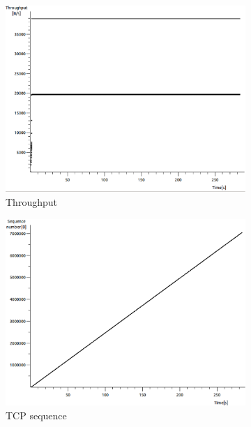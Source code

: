 \documentclass[conference,a4paper]{../../sty/IEEEtran}
\begin{document}
\begin{figure}
 \centering
 \begin{subfigure}[b]{0.2\textwidth}
  \includegraphics[width=\textwidth]{s4-1_thru}
  \caption{Throughput}
 \end{subfigure}
 \begin{subfigure}[b]{0.2\textwidth}
  \includegraphics[width=\textwidth]{s4-1_seq}
  \caption{TCP sequence}
 \end{subfigure}
 \begin{subfigure}[b]{0.2\textwidth}

\end{subfigure}
\end{figure}
\end{document}
